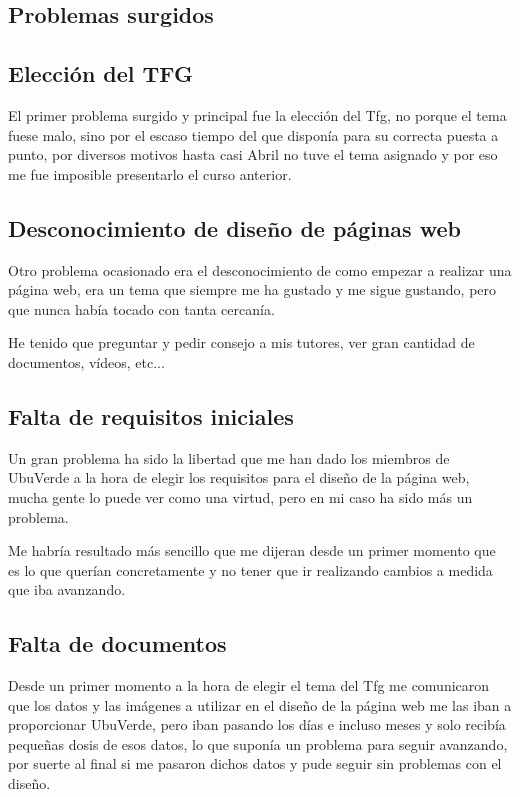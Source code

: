 \begin{itemize}
\section{Problemas surgidos}

\subsection{Elección del TFG}

El primer problema surgido y principal fue la elección del Tfg, no porque el tema fuese malo, sino por el escaso tiempo del que disponía para su correcta puesta a punto, por diversos motivos hasta casi Abril no tuve el tema asignado y por eso me fue imposible presentarlo el curso anterior.

\subsection{Desconocimiento de diseño de páginas web}

Otro problema ocasionado era el desconocimiento de como empezar a realizar una página web, era un tema que siempre me ha gustado y me sigue gustando, pero que nunca había tocado con tanta cercanía.

He tenido que preguntar y pedir consejo a mis tutores, ver gran cantidad de documentos, vídeos, etc...

\subsection{Falta de requisitos iniciales}

Un gran problema ha sido la libertad que me han dado los miembros de UbuVerde a la hora de elegir los requisitos para el diseño de la página web, mucha gente lo puede ver como una virtud, pero en mi caso ha sido más un problema. 

Me habría resultado más sencillo que me dijeran desde un primer momento que es lo que querían concretamente y no tener que ir realizando cambios a medida que iba avanzando.

\subsection{Falta de documentos}

Desde un primer momento a la hora de elegir el tema del Tfg me comunicaron que los datos y las imágenes a utilizar en el diseño de la página web me las iban a proporcionar UbuVerde, pero iban pasando los días e incluso meses y solo recibía pequeñas dosis de esos datos, lo que suponía un problema para seguir avanzando, por suerte al final si me pasaron dichos datos y pude seguir sin problemas con el diseño.


\end{itemize}